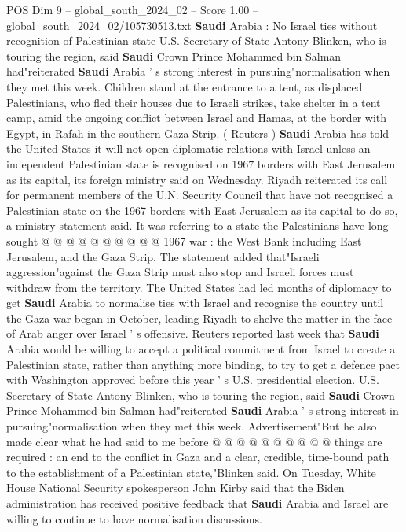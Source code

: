 \begin{textsample}{POS Dim 9 – global\_south\_2024\_02 – Score 1.00 – global\_south\_2024\_02/105730513.txt}  \label{ex:f9_pos_098}
\textbf{Saudi} Arabia : No Israel ties without recognition of Palestinian state U.S.
Secretary of State Antony Blinken, who is touring the region, said \textbf{Saudi} Crown Prince Mohammed bin Salman had"reiterated \textbf{Saudi} Arabia ' s strong interest in pursuing"normalisation when they met this week.
Children stand at the entrance to a tent, as displaced Palestinians, who fled their houses due to Israeli strikes, take shelter in a tent camp, amid the ongoing conflict between Israel and Hamas, at the border with Egypt, in Rafah in the southern Gaza Strip. ( Reuters ) \textbf{Saudi} Arabia has told the United States it will not open diplomatic relations with Israel unless an independent Palestinian state is recognised on 1967 borders with East Jerusalem as its capital, its foreign ministry said on Wednesday.
Riyadh reiterated its call for permanent members of the U.N.
Security Council that have not recognised a Palestinian state on the 1967 borders with East Jerusalem as its capital to do so, a ministry statement said.
It was referring to a state the Palestinians have long sought @ @ @ @ @ @ @ @ @ @ 1967 war : the West Bank including East Jerusalem, and the Gaza Strip.
The statement added that"Israeli aggression"against the Gaza Strip must also stop and Israeli forces must withdraw from the territory.
The United States had led months of diplomacy to get \textbf{Saudi} Arabia to normalise ties with Israel and recognise the country until the Gaza war began in October, leading Riyadh to shelve the matter in the face of Arab anger over Israel ' s offensive.
Reuters reported last week that \textbf{Saudi} Arabia would be willing to accept a political commitment from Israel to create a Palestinian state, rather than anything more binding, to try to get a defence pact with Washington approved before this year ' s U.S. presidential election.
U.S.
Secretary of State Antony Blinken, who is touring the region, said \textbf{Saudi} Crown Prince Mohammed bin Salman had"reiterated \textbf{Saudi} Arabia ' s strong interest in pursuing"normalisation when they met this week.
Advertisement"But he also made clear what he had said to me before @ @ @ @ @ @ @ @ @ @ things are required : an end to the conflict in Gaza and a clear, credible, time-bound path to the establishment of a Palestinian state,"Blinken said.
On Tuesday, White House National Security spokesperson John Kirby said that the Biden administration has received positive feedback that \textbf{Saudi} Arabia and Israel are willing to continue to have normalisation discussions.

\end{textsample}
